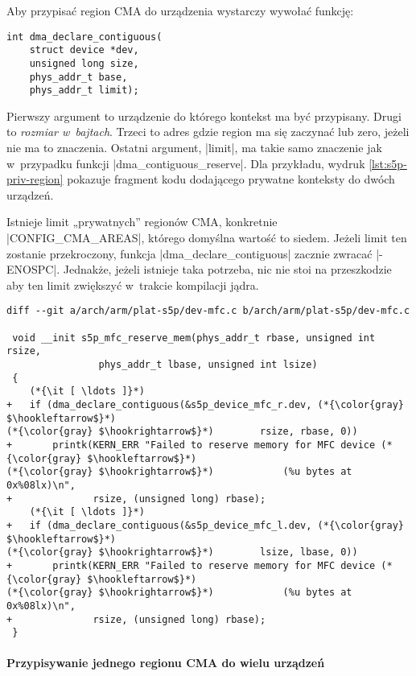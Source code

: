 Aby przypisać region CMA do urządzenia wystarczy wywołać funkcję:

\begin{lstlisting}
int dma_declare_contiguous(
	struct device *dev,
	unsigned long size,
	phys_addr_t base,
	phys_addr_t limit);
\end{lstlisting}

Pierwszy argument to urządzenie do którego kontekst ma być przypisany.
Drugi to \emph{rozmiar w~bajtach}.  Trzeci to adres gdzie region ma
się zaczynać lub zero, jeżeli nie ma to znaczenia.  Ostatni argument,
\code|limit|, ma takie samo znaczenie jak w~przypadku funkcji
\code|dma_contiguous_reserve|.  Dla przykładu, wydruk
\ref{lst:s5p-priv-region} pokazuje fragment kodu dodającego prywatne
konteksty do dwóch urządzeń.

Istnieje limit „prywatnych” regionów CMA, konkretnie
\code|CONFIG_CMA_AREAS|, którego domyślna wartość to siedem.
Jeżeli limit ten zostanie przekroczony, funkcja
\code|dma_declare_contiguous| zacznie zwracać
\code|-ENOSPC|.  Jednakże, jeżeli istnieje taka potrzeba, nic nie
stoi na przeszkodzie aby ten limit zwiększyć w~trakcie kompilacji
jądra.

\begin{lstlisting}[float=tbhp,caption={Przypisanie prywatnych regionów
      CMA do dwóch urządzeń.},label=lst:s5p-priv-region]
diff --git a/arch/arm/plat-s5p/dev-mfc.c b/arch/arm/plat-s5p/dev-mfc.c

 void __init s5p_mfc_reserve_mem(phys_addr_t rbase, unsigned int rsize,
 				phys_addr_t lbase, unsigned int lsize)
 {
	(*{\it [ \ldots ]}*)
+	if (dma_declare_contiguous(&s5p_device_mfc_r.dev, (*{\color{gray} $\hookleftarrow$}*)
(*{\color{gray} $\hookrightarrow$}*)		rsize, rbase, 0))
+		printk(KERN_ERR "Failed to reserve memory for MFC device (*{\color{gray} $\hookleftarrow$}*)
(*{\color{gray} $\hookrightarrow$}*)			(%u bytes at 0x%08lx)\n",
+		       rsize, (unsigned long) rbase);
	(*{\it [ \ldots ]}*)
+	if (dma_declare_contiguous(&s5p_device_mfc_l.dev, (*{\color{gray} $\hookleftarrow$}*)
(*{\color{gray} $\hookrightarrow$}*)		lsize, lbase, 0))
+		printk(KERN_ERR "Failed to reserve memory for MFC device (*{\color{gray} $\hookleftarrow$}*)
(*{\color{gray} $\hookrightarrow$}*)			(%u bytes at 0x%08lx)\n",
+		       rsize, (unsigned long) rbase);
 }
\end{lstlisting}

\paragraph{Przypisywanie jednego regionu CMA do wielu urządzeń} \hspace{0pt} \\


